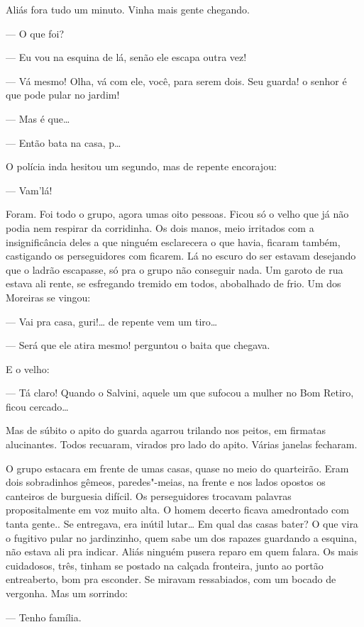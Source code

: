 Aliás fora tudo um minuto. Vinha mais gente chegando.

--- O que foi?

--- Eu vou na esquina de lá, senão ele escapa outra vez!

--- Vá mesmo! Olha, vá com ele, você, para serem dois. Seu guarda! o
senhor é que pode pular no jardim!

--- Mas é que\ldots{}

--- Então bata na casa, p\ldots{}

O polícia inda hesitou um segundo, mas de repente encorajou:

--- Vam'lá!

Foram. Foi todo o grupo, agora umas oito pessoas. Ficou só o velho que
já não podia nem respirar da corridinha. Os dois manos, meio irritados
com a insignificância deles a que ninguém esclarecera o que havia,
ficaram também, castigando os perseguidores com ficarem. Lá no escuro do
ser estavam desejando que o ladrão escapasse, só pra o grupo não
conseguir nada. Um garoto de rua estava ali rente, se esfregando tremido
em todos, abobalhado de frio. Um dos Moreiras se vingou:

--- Vai pra casa, guri!\ldots{} de repente vem um tiro\ldots{}

--- Será que ele atira mesmo! perguntou o baita que chegava.

E o velho:

--- Tá claro! Quando o Salvini, aquele um que sufocou a mulher no Bom
Retiro, ficou cercado\ldots{}

Mas de súbito o apito do guarda agarrou trilando nos peitos, em firmatas
alucinantes. Todos recuaram, virados pro lado do apito. Várias janelas
fecharam.

O grupo estacara em frente de umas casas, quase no meio do quarteirão.
Eram dois sobradinhos gêmeos, paredes"-meias, na frente e nos lados
opostos os canteiros de burguesia difícil. Os perseguidores trocavam
palavras propositalmente em voz muito alta. O homem decerto ficava
amedrontado com tanta gente.. Se entregava, era inútil lutar\ldots{} Em qual
das casas bater? O que vira o fugitivo pular no jardinzinho, quem sabe
um dos rapazes guardando a esquina, não estava ali pra indicar. Aliás
ninguém pusera reparo em quem falara. Os mais cuidadosos, três, tinham
se postado na calçada fronteira, junto ao portão entreaberto, bom pra
esconder. Se miravam ressabiados, com um bocado de vergonha. Mas um
sorrindo:

--- Tenho família.

